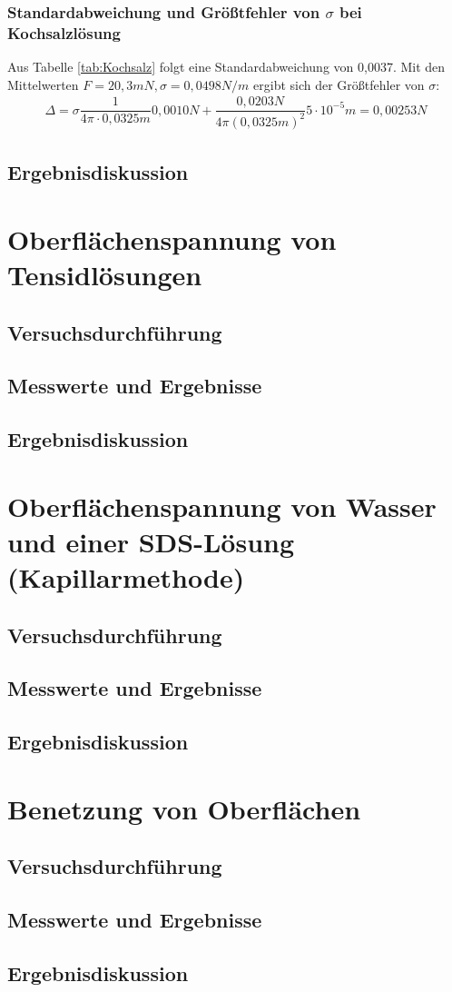 \documentclass{scrartcl}
\begin{document}
\subsubsection{Standardabweichung und Größtfehler von $\sigma$ bei Kochsalzlösung}
Aus Tabelle \ref{tab:Kochsalz} folgt eine Standardabweichung von 0,0037. Mit den Mittelwerten $F = 20,3mN, \sigma = 0,0498N/m$ ergibt sich der Größtfehler von $\sigma$:
\begin{align*}
\Delta = \sigma \dfrac{1}{4 \pi \cdot 0,0325m} 0,0010N + \dfrac{0,0203N}{4 \pi (0,0325m)^2} 5 \cdot 10^{-5}m = 0,00253N
\end{align*}
\subsection{Ergebnisdiskussion}


\section{Oberflächenspannung von Tensidlösungen}
\subsection{Versuchsdurchführung}
\subsection{Messwerte und Ergebnisse}
\subsection{Ergebnisdiskussion}


\section{Oberflächenspannung von Wasser und einer SDS-Lösung (Kapillarmethode)}
\subsection{Versuchsdurchführung}
\subsection{Messwerte und Ergebnisse}
\subsection{Ergebnisdiskussion}


\section{Benetzung von Oberflächen}
\subsection{Versuchsdurchführung}
\subsection{Messwerte und Ergebnisse}
\subsection{Ergebnisdiskussion}
\end{document}
